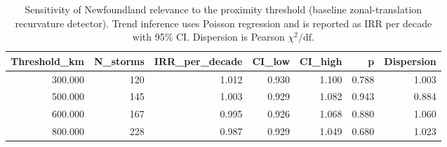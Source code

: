\begin{table}[H]
\centering
\caption{Sensitivity of Newfoundland relevance to the proximity threshold (baseline zonal-translation recurvature detector). Trend inference uses Poisson regression and is reported as IRR per decade with 95\% CI. Dispersion is Pearson $\chi^2/\mathrm{df}$.}
\label{tab:dist_sens}
\begin{tabular}{r r r r r r r}
\hline
Threshold_km & N_storms & IRR_per_decade & CI_low & CI_high & p & Dispersion \\
\hline
300.000 & 120 & 1.012 & 0.930 & 1.100 & 0.788 & 1.003 \\
500.000 & 145 & 1.003 & 0.929 & 1.082 & 0.943 & 0.884 \\
600.000 & 167 & 0.995 & 0.926 & 1.068 & 0.880 & 1.060 \\
800.000 & 228 & 0.987 & 0.929 & 1.049 & 0.680 & 1.023 \\
\hline
\end{tabular}

\end{table}